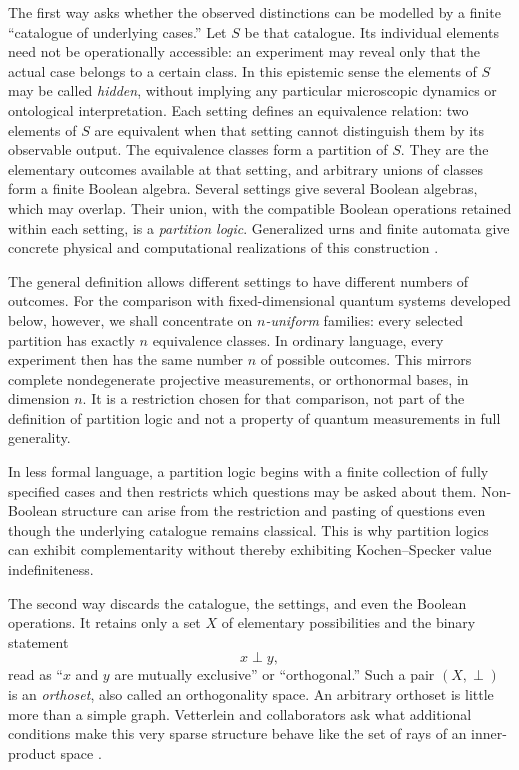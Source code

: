 \documentclass[
  aps,
  pra,
  twocolumn,
  amsmath,
  amssymb,
  longbibliography,
  nofootinbib,
  floatfix
]{revtex4-2}
\begin{document}
The first way asks whether the observed distinctions can be modelled by a
finite ``catalogue of underlying cases.''  Let $S$ be that catalogue.  Its
individual elements need not be operationally accessible: an experiment may
reveal only that the actual case belongs to a certain class.  In this epistemic
sense the elements of $S$ may be called \emph{hidden}, without implying any
particular microscopic dynamics or ontological interpretation.  Each setting
defines an equivalence relation: two elements of $S$ are equivalent when that
setting cannot distinguish them by its observable output.  The equivalence
classes form a partition of $S$.  They are the elementary outcomes available
at that setting, and arbitrary unions of classes form a finite Boolean algebra.
Several settings give several Boolean algebras, which may overlap.  Their union,
with the compatible Boolean operations retained within each setting, is a
\emph{partition logic}.  Generalized urns and finite automata give concrete
physical and computational realizations of this construction
\cite{wright,schaller-96,svozil-2001-eua}.

The general definition allows different settings to have different numbers of
outcomes.  For the comparison with fixed-dimensional quantum systems developed
below, however, we shall concentrate on \emph{$n$-uniform} families: every
selected partition has exactly $n$ equivalence classes.  In ordinary language,
every experiment then has the same number $n$ of possible outcomes.  This
mirrors complete nondegenerate projective measurements, or orthonormal bases, in
dimension $n$.  It is a restriction chosen for that comparison, not part of the
definition of partition logic and not a property of quantum measurements in
full generality.

In less formal language, a partition logic begins with a finite collection of
fully specified cases and then restricts which questions may be asked about
them.  Non-Boolean structure can arise from the restriction and pasting of
questions even though the underlying catalogue remains classical.  This is why
partition logics can exhibit complementarity without thereby exhibiting
Kochen--Specker value indefiniteness.

The second way discards the catalogue, the settings, and even the Boolean
operations.  It retains only a set $X$ of elementary possibilities and the
binary statement
\[
  x\perp y,
\]
read as ``$x$ and $y$ are mutually exclusive'' or ``orthogonal.''  Such a pair
$(X,\perp)$ is an \emph{orthoset}, also called an orthogonality space.  An
arbitrary orthoset is little more than a simple graph.  Vetterlein and
collaborators ask what additional conditions make this very sparse structure
behave like the set of rays of an inner-product space
\cite{EmirKrumlPasekaVetterlein2021,PasekaVetterlein2023Linear}.
\end{document}
